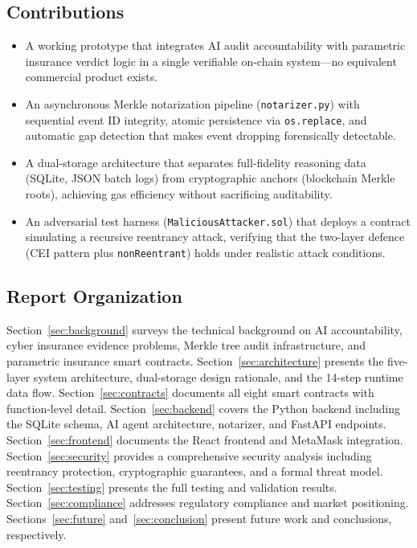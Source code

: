\documentclass[12pt,a4paper]{article}
\begin{document}
\subsection{Contributions}
\label{sec:contributions}

\begin{itemize}
  \item A working prototype that integrates AI audit accountability with
        parametric insurance verdict logic in a single verifiable on-chain
        system---no equivalent commercial product exists.
  \item An asynchronous Merkle notarization pipeline
        (\texttt{notarizer.py}) with sequential event ID integrity,
        atomic persistence via \texttt{os.replace}, and automatic gap
        detection that makes event dropping forensically detectable.
  \item A dual-storage architecture that separates full-fidelity
        reasoning data (SQLite, JSON batch logs) from cryptographic
        anchors (blockchain Merkle roots), achieving gas efficiency
        without sacrificing auditability.
  \item An adversarial test harness (\texttt{MaliciousAttacker.sol})
        that deploys a contract simulating a recursive reentrancy attack,
        verifying that the two-layer defence (CEI pattern plus
        \texttt{nonReentrant}) holds under realistic attack conditions.
\end{itemize}

\subsection{Report Organization}
\label{sec:organization}

Section~\ref{sec:background} surveys the technical background on AI
accountability, cyber insurance evidence problems, Merkle tree audit
infrastructure, and parametric insurance smart contracts.
Section~\ref{sec:architecture} presents the five-layer system
architecture, dual-storage design rationale, and the 14-step runtime
data flow. Section~\ref{sec:contracts} documents all eight smart
contracts with function-level detail. Section~\ref{sec:backend} covers
the Python backend including the SQLite schema, AI agent architecture,
notarizer, and FastAPI endpoints. Section~\ref{sec:frontend} documents
the React frontend and MetaMask integration. Section~\ref{sec:security}
provides a comprehensive security analysis including reentrancy
protection, cryptographic guarantees, and a formal threat model.
Section~\ref{sec:testing} presents the full testing and validation
results. Section~\ref{sec:compliance} addresses regulatory compliance
and market positioning. Sections~\ref{sec:future} and~\ref{sec:conclusion}
present future work and conclusions, respectively.
\end{document}
